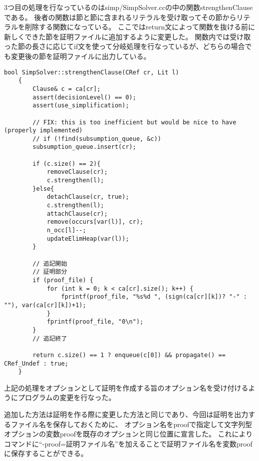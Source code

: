 3つ目の処理を行なっているのはsimp/SimpSolver.ccの中の関数strengthenClauseである。
後者の関数は節と節に含まれるリテラルを受け取ってその節からリテラルを削除する関数になっている。
ここではreturn文によって関数を抜ける前に新しくできた節を証明ファイルに追加するように変更した。
関数内では受け取った節の長さに応じてif文を使って分岐処理を行なっているが、どちらの場合でも変更後の節を証明ファイルに出力している。
\begin{lstlisting}[caption=関数strengthenClauseの変更(simp/SimpSolver.cc), firstnumber=203]
    bool SimpSolver::strengthenClause(CRef cr, Lit l)
    {
        Clause& c = ca[cr];
        assert(decisionLevel() == 0);
        assert(use_simplification);

        // FIX: this is too inefficient but would be nice to have (properly implemented)
        // if (!find(subsumption_queue, &c))
        subsumption_queue.insert(cr);

        if (c.size() == 2){
            removeClause(cr);
            c.strengthen(l);
        }else{
            detachClause(cr, true);
            c.strengthen(l);
            attachClause(cr);
            remove(occurs[var(l)], cr);
            n_occ[l]--;
            updateElimHeap(var(l));
        }

        // 追記開始
        // 証明部分
        if (proof_file) {
            for (int k = 0; k < ca[cr].size(); k++) {
                fprintf(proof_file, "%s%d ", (sign(ca[cr][k])? "-" : ""), var(ca[cr][k])+1);
            }
            fprintf(proof_file, "0\n");
        }
        // 追記終了

        return c.size() == 1 ? enqueue(c[0]) && propagate() == CRef_Undef : true;
    }
\end{lstlisting}

上記の処理をオプションとして証明を作成する旨のオプション名を受け付けるようにプログラムの変更を行なった。

追加した方法は証明を作る際に変更した方法と同じであり、今回は証明を出力するファイル名を保存しておくために、
オプション名をproofで指定して文字列型オプションの変数proofを既存のオプションと同じ位置に宣言した。
これによりコマンドに``-proof=証明ファイル名''を加えることで証明ファイル名を変数proofに保存することができる。

